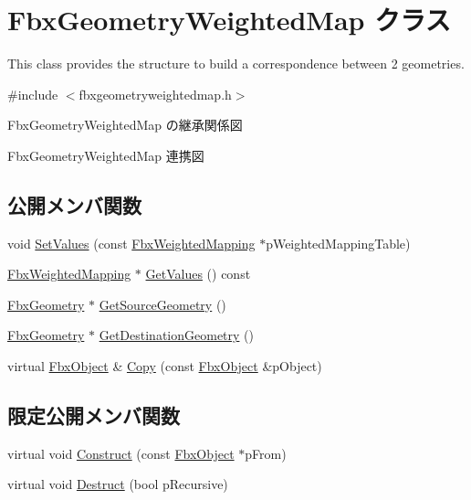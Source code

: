 \hypertarget{class_fbx_geometry_weighted_map}{}\section{Fbx\+Geometry\+Weighted\+Map クラス}
\label{class_fbx_geometry_weighted_map}


This class provides the structure to build a correspondence between 2 geometries.  




{\ttfamily \#include $<$fbxgeometryweightedmap.\+h$>$}



Fbx\+Geometry\+Weighted\+Map の継承関係図


Fbx\+Geometry\+Weighted\+Map 連携図
\subsection*{公開メンバ関数}
\begin{DoxyCompactItemize}
\item 
void \hyperlink{class_fbx_geometry_weighted_map_a42bb06040581c024f72d39e6a4318f4f}{Set\+Values} (const \hyperlink{class_fbx_weighted_mapping}{Fbx\+Weighted\+Mapping} $\ast$p\+Weighted\+Mapping\+Table)
\item 
\hyperlink{class_fbx_weighted_mapping}{Fbx\+Weighted\+Mapping} $\ast$ \hyperlink{class_fbx_geometry_weighted_map_a55d4ce89b77af065e73c32b9e5bd17e5}{Get\+Values} () const
\item 
\hyperlink{class_fbx_geometry}{Fbx\+Geometry} $\ast$ \hyperlink{class_fbx_geometry_weighted_map_a5177720946120c17fe2003a979256e00}{Get\+Source\+Geometry} ()
\item 
\hyperlink{class_fbx_geometry}{Fbx\+Geometry} $\ast$ \hyperlink{class_fbx_geometry_weighted_map_ac0d7b29146fd71ceed30e13bf99f2656}{Get\+Destination\+Geometry} ()
\item 
virtual \hyperlink{class_fbx_object}{Fbx\+Object} \& \hyperlink{class_fbx_geometry_weighted_map_aa0310025b01de1d69b9f313a886df3c0}{Copy} (const \hyperlink{class_fbx_object}{Fbx\+Object} \&p\+Object)
\end{DoxyCompactItemize}
\subsection*{限定公開メンバ関数}
\begin{DoxyCompactItemize}
\item 
virtual void \hyperlink{class_fbx_geometry_weighted_map_af8485ac8574bf4ac9222de920a98e81f}{Construct} (const \hyperlink{class_fbx_object}{Fbx\+Object} $\ast$p\+From)
\item 
virtual void \hyperlink{class_fbx_geometry_weighted_map_a638d84bf777db4a17d63505f62d9f22f}{Destruct} (bool p\+Recursive)
\end{DoxyCompactItemize}
